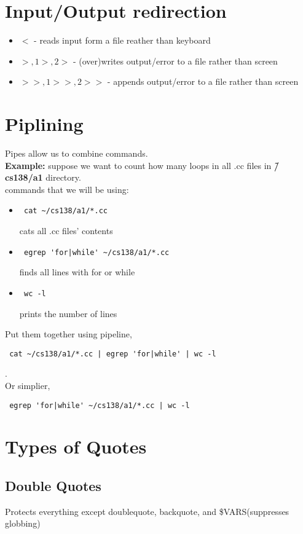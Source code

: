 \documentclass[12pt]{article}
\begin{document}
\section{Input/Output redirection}
\begin{itemize}
    \item \textbf{$<$} - reads input form a file reather than keyboard
    \item \textbf{$>, 1>, 2>$} - (over)writes output/error to a file rather than screen
    \item \textbf{$>>, 1>>, 2>>$} - appends output/error to a file rather than screen
\end{itemize}

\section{Piplining}
Pipes allow us to combine commands.\\
\textbf{Example: }suppose we want to count how many loops in all .cc files in \textbf{\~/cs138/a1} directory.\\
commands that we will be using:
\begin{itemize}
    \item \begin{verbatim} cat ~/cs138/a1/*.cc \end{verbatim} cats all .cc files' contents
    \item \begin{verbatim} egrep 'for|while' ~/cs138/a1/*.cc \end{verbatim} finds all lines with for or while
    \item \begin{verbatim} wc -l \end{verbatim} prints the number of lines
\end{itemize}
Put them together using pipeline, \begin{verbatim} cat ~/cs138/a1/*.cc | egrep 'for|while' | wc -l \end{verbatim}.\\
Or simplier, \begin{verbatim} egrep 'for|while' ~/cs138/a1/*.cc | wc -l \end{verbatim}

\section{Types of Quotes}
\subsection{Double Quotes}
Protects everything except doublequote, backquote, and \$VARS(suppresses globbing)
\end{document}
